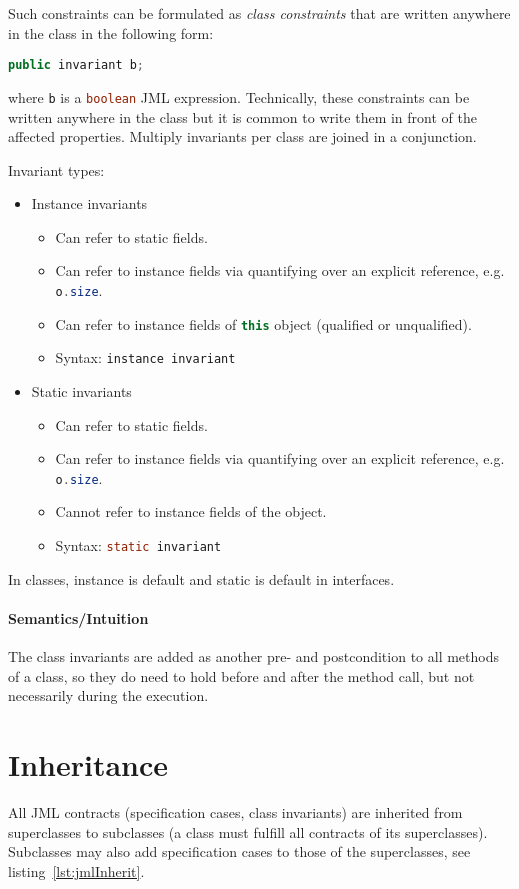 \documentclass[a4paper, 11pt, accentcolor = tud3b]{tudreport}
\newcommand{\inlineJava}[1]{\lstinline[language = Java]|#1|}
\begin{document}
				Such constraints can be formulated as \textit{class constraints} that are written anywhere in the class in the following form:
				\begin{center}
					\inlineJava{public invariant b;}
				\end{center}
				where \texttt{b} is a \inlineJava{boolean} JML expression. Technically, these constraints can be written anywhere in the class but it is common to write them in front of the affected properties. Multiply invariants per class are joined in a conjunction.
				
				Invariant types:
				\begin{itemize}
					\item Instance invariants
						\begin{itemize}
							\item Can refer to static fields.
							\item Can refer to instance fields via quantifying over an explicit reference, e.g. \inlineJava{o.size}.
							\item Can refer to instance fields of \inlineJava{this} object (qualified or unqualified).
							\item Syntax: \inlineJava{instance invariant}
						\end{itemize}
					\item Static invariants
						\begin{itemize}
							\item Can refer to static fields.
							\item Can refer to instance fields via quantifying over an explicit reference, e.g. \inlineJava{o.size}.
							\item Cannot refer to instance fields of the object.
							\item Syntax: \inlineJava{static invariant}
						\end{itemize}
				\end{itemize}
				In classes, instance is default and static is default in interfaces.
				
				\paragraph{Semantics/Intuition}
					The class invariants are added as another pre- and postcondition to all methods of a class, so they do need to hold before and after the method call, but not necessarily during the execution.

		\section{Inheritance}
			All JML contracts (specification cases, class invariants) are inherited from superclasses to subclasses (a class must fulfill all contracts of its superclasses). Subclasses may also add specification cases to those of the superclasses, see listing~\ref{lst:jmlInherit}.
			
\end{document}
